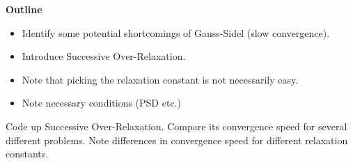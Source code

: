 

{\bf Outline}
\begin{itemize}
\item Identify some potential shortcomings of Gauss-Sidel (slow convergence).
\item Introduce Successive Over-Relaxation.
\item Note that picking the relaxation constant is not necessarily easy.
\item Note necessary conditions (PSD etc.)
\end{itemize}

\begin{problem}
Code up Successive Over-Relaxation. Compare its convergence speed for several different problems. Note differences in convergence speed for different relaxation constants.
\end{problem}